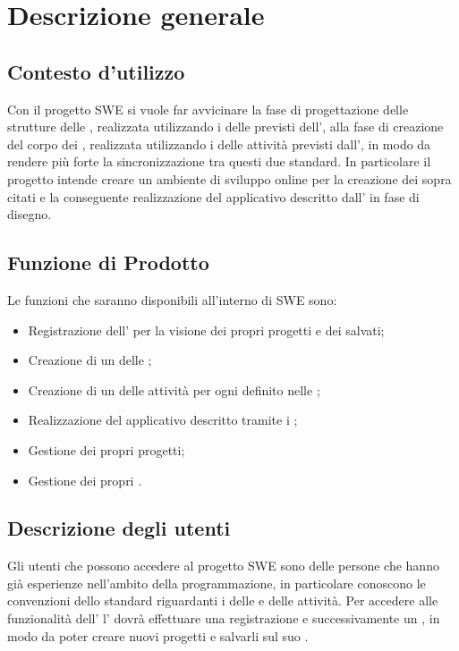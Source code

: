 \section{Descrizione generale}
\subsection{Contesto d'utilizzo}
Con il progetto SWE si vuole far avvicinare la fase di progettazione delle strutture delle , realizzata utilizzando i  delle  previsti dell', alla fase di creazione del corpo dei , realizzata utilizzando i  delle attività previsti dall', in modo da  rendere più forte la sincronizzazione tra questi due standard. In particolare il progetto intende creare un ambiente di sviluppo online per la creazione dei  sopra citati e la conseguente realizzazione del  applicativo descritto dall' in fase di disegno.
 
\subsection{Funzione di Prodotto}
Le funzioni che saranno disponibili all'interno di SWE sono:
\begin{itemize}
\item Registrazione dell' per la visione dei propri progetti e dei  salvati; 
\item Creazione di un  delle ; 
\item Creazione di un  delle attività per ogni  definito nelle ;
\item Realizzazione del  applicativo descritto tramite i ;
\item Gestione dei propri progetti;
\item Gestione dei propri .
\end{itemize}

\subsection{Descrizione degli utenti}
Gli utenti che possono accedere al progetto SWE sono delle persone che hanno già esperienze nell'ambito della programmazione, in particolare conoscono le convenzioni dello standard  riguardanti i  delle  e delle attività. 
Per accedere alle funzionalità dell' l' dovrà effettuare una registrazione e successivamente un , in modo da poter creare nuovi progetti e salvarli sul suo .